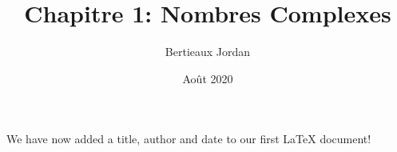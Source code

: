 \documentclass{article}
\title{Chapitre 1: Nombres Complexes}
\author{Bertieaux Jordan}
\date{Août 2020}
\begin{document}
\maketitle
We have now added a title, author and date to our first \LaTeX{} document!
\end{document}
